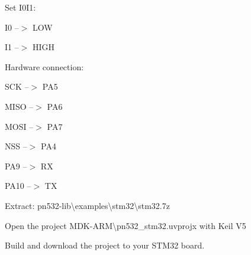 \begin{DoxyEnumerate}
\item Set I0\+I1\+:
\end{DoxyEnumerate}
\begin{DoxyItemize}
\item I0 --$>$ L\+O\+W
\item I1 --$>$ H\+I\+G\+H
\end{DoxyItemize}
\begin{DoxyEnumerate}
\item Hardware connection\+:
\end{DoxyEnumerate}
\begin{DoxyItemize}
\item S\+C\+K --$>$ P\+A5
\item M\+I\+S\+O --$>$ P\+A6
\item M\+O\+S\+I --$>$ P\+A7
\item N\+S\+S --$>$ P\+A4
\item P\+A9 --$>$ R\+X
\item P\+A10 --$>$ T\+X
\end{DoxyItemize}
\begin{DoxyEnumerate}
\item Extract\+: pn532-\/lib\textbackslash{}examples\textbackslash{}stm32\textbackslash{}stm32.\+7z
\item Open the project M\+D\+K-\/\+A\+R\+M\textbackslash{}pn532\+\_\+stm32.\+uvprojx with Keil V5
\item Build and download the project to your S\+T\+M32 board. 
\end{DoxyEnumerate}